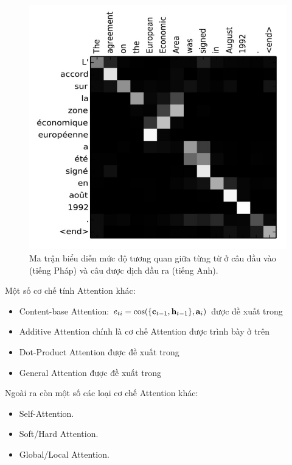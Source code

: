 \documentclass[14pt, a4paper]{article}
\numberwithin{equation}{section}
\numberwithin{algorithm}{section}
\numberwithin{figure}{section}
\numberwithin{dl}{section}
\numberwithin{md}{section}
\numberwithin{bd}{section}
\numberwithin{dn}{section}
\numberwithin{hq}{section}
\begin{document}
    \begin{figure}[h!] \centering

        \includegraphics[scale=0.5]{Attention_Map.jpg}
        \caption{Ma trận biểu diễn mức độ tương quan giữa từng từ ở câu đầu vào (tiếng Pháp) và câu được dịch đầu ra (tiếng Anh).}
    
        \label{fig:Attention_Map}
    \end{figure}

    Một số cơ chế tính Attention khác:

    \begin{itemize}
        \item Content-base Attention: $e_{ti}=\cos(\lbrace \bold{c}_{t-1}, \bold{h}_{t-1} \rbrace, \bold{a}_i)$ được đề xuất trong \cite{graves2014neural}
        \item Additive Attention chính là cơ chế Attention được trình bày ở trên \cite{bahdanau2014neural}
        \item Dot-Product Attention được đề xuất trong \cite{luong2015effective}
        \item General Attention được đề xuất trong \cite{luong2015effective}
    \end{itemize}

    Ngoài ra còn một số các loại cơ chế Attention khác:

    \begin{itemize}
        \item Self-Attention.
        \item Soft/Hard Attention.
        \item Global/Local Attention.
    \end{itemize}
\end{document}
